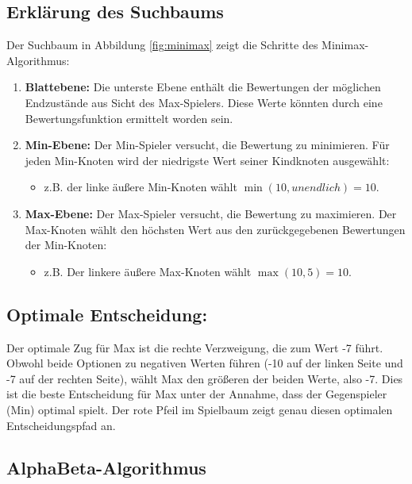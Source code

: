 \subsection*{Erklärung des Suchbaums}

Der Suchbaum in Abbildung \ref{fig:minimax} zeigt die Schritte des Minimax-Algorithmus:

\begin{enumerate}
	\item \textbf{Blattebene:} Die unterste Ebene enthält die Bewertungen der möglichen Endzustände aus Sicht des Max-Spielers. Diese Werte könnten durch eine Bewertungsfunktion ermittelt worden sein.

	\item \textbf{Min-Ebene:} Der Min-Spieler versucht, die Bewertung zu minimieren. Für jeden Min-Knoten wird der niedrigste Wert seiner Kindknoten ausgewählt:
	\begin{itemize}
		\item z.B. der linke äußere Min-Knoten wählt $\min(10, unendlich) = 10$.
	\end{itemize}
	
	\item \textbf{Max-Ebene:} Der Max-Spieler versucht, die Bewertung zu maximieren. Der Max-Knoten wählt den höchsten Wert aus den zurückgegebenen Bewertungen der Min-Knoten:
	\begin{itemize}
		\item z.B. Der linkere äußere Max-Knoten wählt $\max(10, 5) = 10$.
	\end{itemize}
\end{enumerate}

\subsection*{Optimale Entscheidung:}

Der optimale Zug für Max ist die rechte Verzweigung, die zum Wert -7 führt. Obwohl beide Optionen zu negativen Werten führen (-10 auf der linken Seite und -7 auf der rechten Seite), wählt Max den größeren der beiden Werte, also -7. Dies ist die beste Entscheidung für Max unter der Annahme, dass der Gegenspieler (Min) optimal spielt. Der rote Pfeil im Spielbaum zeigt genau diesen optimalen Entscheidungspfad an.

\subsection{AlphaBeta-Algorithmus}

